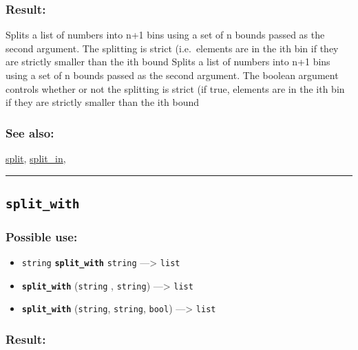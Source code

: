 \documentclass[]{book}
\providecommand{\tightlist}{%
  \setlength{\itemsep}{0pt}\setlength{\parskip}{0pt}}
\theoremstyle{definition}
\theoremstyle{definition}
\theoremstyle{definition}
\theoremstyle{remark}
\begin{document}
\subsubsection{Result:}\label{result-480}

Splits a list of numbers into n+1 bins using a set of n bounds passed as
the second argument. The splitting is strict (i.e.~elements are in the
ith bin if they are strictly smaller than the ith bound Splits a list of
numbers into n+1 bins using a set of n bounds passed as the second
argument. The boolean argument controls whether or not the splitting is
strict (if true, elements are in the ith bin if they are strictly
smaller than the ith bound

\subsubsection{See also:}\label{see-also-194}

\href{operators-s-to-z.html\#split}{split},
\href{operators-s-to-z.html\#split_in}{split\_in},

\begin{center}\rule{0.5\linewidth}{\linethickness}\end{center}

\subsection{\texorpdfstring{\texttt{split\_with}}{split\_with}}\label{split_with}

\subsubsection{Possible use:}\label{possible-use-497}

\begin{itemize}
\tightlist
\item
  \texttt{string} \textbf{\texttt{split\_with}} \texttt{string}
  ---\textgreater{} \texttt{list}
\item
  \textbf{\texttt{split\_with}} (\texttt{string} , \texttt{string})
  ---\textgreater{} \texttt{list}
\item
  \textbf{\texttt{split\_with}} (\texttt{string}, \texttt{string},
  \texttt{bool}) ---\textgreater{} \texttt{list}
\end{itemize}

\subsubsection{Result:}\label{result-481}
\end{document}

